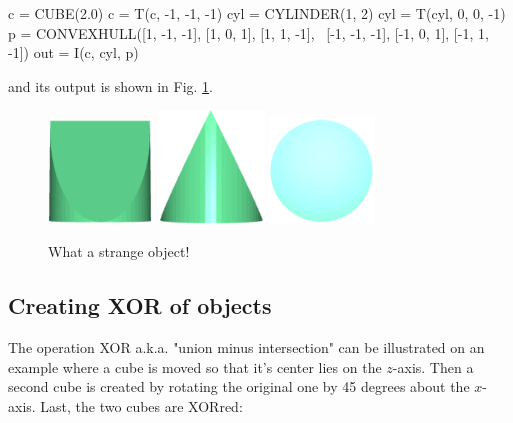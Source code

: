 \begin{bluecode}
c = CUBE(2.0)
c = T(c, -1, -1, -1)
cyl = CYLINDER(1, 2)
cyl = T(cyl, 0, 0, -1)
p = CONVEXHULL([1, -1, -1], [1, 0, 1], [1, 1, -1], \
                [-1, -1, -1], [-1, 0, 1], [-1, 1, -1])
out = I(c, cyl, p)
\end{bluecode}
and its output is shown in Fig. \ref{fig:int-1}.\\

\begin{figure}[!ht]
\begin{center}
\includegraphics[width=0.25\textwidth]{img/int-1a.png}
\includegraphics[width=0.25\textwidth]{img/int-1b.png}
\includegraphics[width=0.25\textwidth]{img/int-1c.png}
\end{center}
\vspace{-4mm}
\caption{What a strange object!}
\label{fig:int-1}
\end{figure}


\subsection{Creating XOR of objects}\label{subsec:xor}

The operation XOR a.k.a. "union minus intersection" can be illustrated  
on an example where a cube is moved so that it's center lies on the $z$-axis. Then 
a second cube is created by rotating the original one by 45 degrees about the 
$x$-axis. Last, the two cubes are XORred:
 
